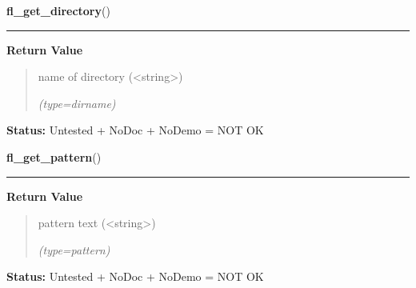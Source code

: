     \label{xformslib:library:fl_get_directory}

    \vspace{0.5ex}

\hspace{.8\funcindent}\begin{boxedminipage}{\funcwidth}

    \raggedright \textbf{fl\_get\_directory}()

    \vspace{-1.5ex}

    \rule{\textwidth}{0.5\fboxrule}
\setlength{\parskip}{2ex}
\setlength{\parskip}{1ex}
      \textbf{Return Value}
    \vspace{-1ex}

      \begin{quote}
      name of directory ({\textless}string{\textgreater})

      {\it (type=dirname)}

      \end{quote}

\textbf{Status:} Untested + NoDoc + NoDemo = NOT OK



    \end{boxedminipage}

    \label{xformslib:library:fl_get_pattern}

    \vspace{0.5ex}

\hspace{.8\funcindent}\begin{boxedminipage}{\funcwidth}

    \raggedright \textbf{fl\_get\_pattern}()

    \vspace{-1.5ex}

    \rule{\textwidth}{0.5\fboxrule}
\setlength{\parskip}{2ex}
\setlength{\parskip}{1ex}
      \textbf{Return Value}
    \vspace{-1ex}

      \begin{quote}
      pattern text ({\textless}string{\textgreater})

      {\it (type=pattern)}

      \end{quote}

\textbf{Status:} Untested + NoDoc + NoDemo = NOT OK



    \end{boxedminipage}

